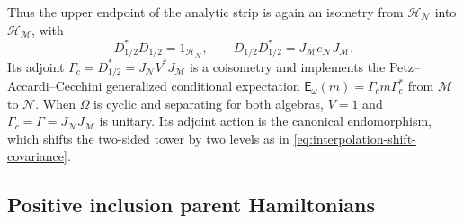 \documentclass[a4paper,11pt]{article}
\theoremstyle{definition}
\newcommand{\mN}{\mathcal{N}}
\newcommand{\mH}{\mathcal{H}}
\newcommand{\mM}{\mathcal{M}}
\begin{document}
Thus the upper endpoint of the analytic strip is again an isometry from
$\mH_{\mN}$ into $\mH_{\mM}$, with
\begin{equation}
    D_{1/2}^*D_{1/2}=1_{\mH_{\mN}},\qquad
    D_{1/2}D_{1/2}^*=J_{\mM}e_{\mN}J_{\mM}.
\end{equation}
Its adjoint $\Gamma_c=D_{1/2}^*=J_{\mN}V^*J_{\mM}$ is a coisometry and
implements the Petz--Accardi--Cecchini generalized conditional expectation
$\mathsf E_\omega(m)=\Gamma_c m\Gamma_c^*$ from $\mM$ to $\mN$.
When $\Omega$ is cyclic and separating for both algebras, $V=1$ and
$\Gamma_c=\Gamma=J_{\mN}J_{\mM}$ is unitary. Its adjoint action is the
canonical endomorphism, which shifts the two-sided tower by two levels
as in \eqref{eq:interpolation-shift-covariance}. 



\subsection{Positive inclusion parent Hamiltonians}
\end{document}
